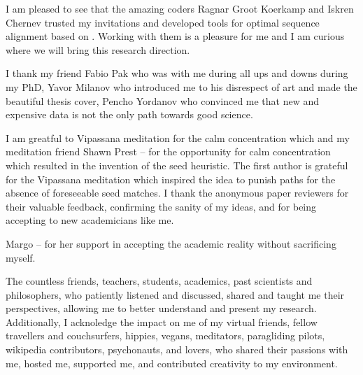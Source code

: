 I am pleased to see that the amazing coders Ragnar Groot Koerkamp and Iskren
Chernev trusted my invitations and developed tools for optimal sequence
alignment based on \A. Working with them is a pleasure for me and I am curious
where we will bring this research direction.

I thank my friend Fabio Pak who was with me during all ups and downs during my
PhD, Yavor Milanov who introduced me to his disrespect of art and made the
beautiful thesis cover, Pencho Yordanov who convinced me that new and expensive
data is not the only path towards good science.

I am greatful to Vipassana meditation for the calm concentration which and my
meditation friend Shawn Prest -- for the opportunity for calm concentration
which resulted in the invention of the seed heuristic. The first author is
grateful for the Vipassana meditation which inspired the idea to punish paths
for the absence of foreseeable seed matches.
I thank the anonymous paper reviewers for their valuable feedback, confirming
the sanity of my ideas, and for being accepting to new academicians like me. 

Margo -- for her support in accepting the academic reality without sacrificing myself.

The countless friends, teachers, students, academics, past scientists and
philosophers, who patiently listened and discussed, shared and taught me their
perspectives, allowing me to better understand and present my research.
Additionally, I acknoledge the impact on me of my virtual friends, fellow
travellers and couchsurfers, hippies, vegans, meditators, paragliding pilots,
wikipedia contributors, psychonauts, and lovers, who shared their passions with
me, hosted me, supported me, and contributed creativity to my environment.

\endgroup

